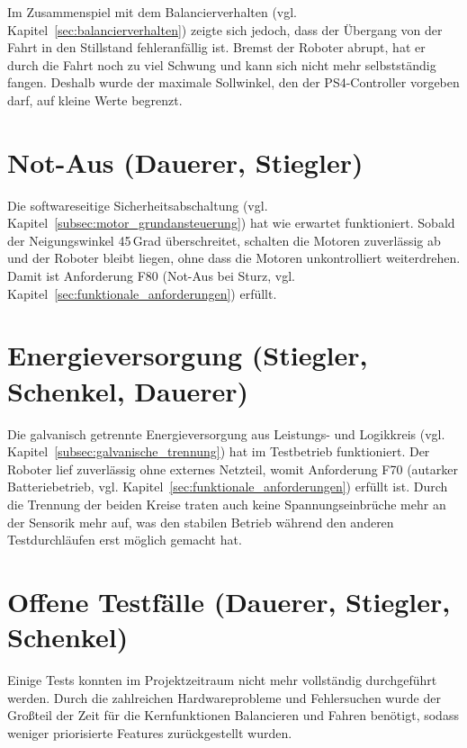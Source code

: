 \documentclass[fontsize=12pt,
parskip=half,	%
department=FakM,  %
logostyle=flat,
twoside, %
DIV=15,BCOR=10mm, %
]{OTHRreprt}
\begin{document}
Im Zusammenspiel mit dem Balancierverhalten (vgl. Kapitel~\ref{sec:balancierverhalten}) zeigte sich jedoch, dass der Übergang von der Fahrt in den Stillstand fehleranfällig ist. Bremst der Roboter abrupt, hat er durch die Fahrt noch zu viel Schwung und kann sich nicht mehr selbstständig fangen. Deshalb wurde der maximale Sollwinkel, den der PS4-Controller vorgeben darf, auf kleine Werte begrenzt.

\section{Not-Aus (Dauerer, Stiegler)}
\label{sec:test_notaus}

Die softwareseitige Sicherheitsabschaltung (vgl. Kapitel~\ref{subsec:motor_grundansteuerung}) hat wie erwartet funktioniert. Sobald der Neigungswinkel 45\,Grad überschreitet, schalten die Motoren zuverlässig ab und der Roboter bleibt liegen, ohne dass die Motoren unkontrolliert weiterdrehen. Damit ist Anforderung F80 (Not-Aus bei Sturz, vgl. Kapitel~\ref{sec:funktionale_anforderungen}) erfüllt.

\section{Energieversorgung (Stiegler, Schenkel, Dauerer)}
\label{sec:test_energieversorgung}

Die galvanisch getrennte Energieversorgung aus Leistungs- und Logikkreis (vgl. Kapitel~\ref{subsec:galvanische_trennung}) hat im Testbetrieb funktioniert. Der Roboter lief zuverlässig ohne externes Netzteil, womit Anforderung F70 (autarker Batteriebetrieb, vgl. Kapitel~\ref{sec:funktionale_anforderungen}) erfüllt ist. Durch die Trennung der beiden Kreise traten auch keine Spannungseinbrüche mehr an der Sensorik mehr auf, was den stabilen Betrieb während den anderen Testdurchläufen erst möglich gemacht hat.

\section{Offene Testfälle (Dauerer, Stiegler, Schenkel)}
\label{sec:offene_testfaelle}

Einige Tests konnten im Projektzeitraum nicht mehr vollständig durchgeführt werden. Durch die zahlreichen Hardwareprobleme und Fehlersuchen wurde der Großteil der Zeit für die Kernfunktionen Balancieren und Fahren benötigt, sodass weniger priorisierte Features zurückgestellt wurden.
\end{document}
